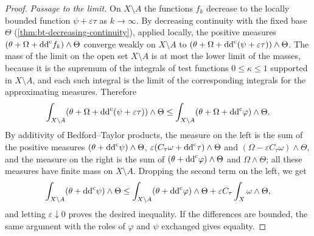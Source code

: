 \begin{proof}
\emph{Passage to the limit.} On $X\setminus A$ the functions $f_k$ decrease to the locally bounded function $\psi+\varepsilon\tau$ as $k\to\infty$. By decreasing continuity with the fixed base $\Theta$ (\cref{thm:bt-decreasing-continuity}), applied locally, the positive measures $(\theta+\Omega+\mathrm{dd}^{\mathrm{c}} f_k)\wedge\Theta$ converge weakly on $X\setminus A$ to $(\theta+\Omega+\mathrm{dd}^{\mathrm{c}}(\psi+\varepsilon\tau))\wedge\Theta$. The mass of the limit on the open set $X\setminus A$ is at most the lower limit of the masses, because it is the supremum of the integrals of test functions $0\leq\kappa\leq1$ supported in $X\setminus A$, and each such integral is the limit of the corresponding integrals for the approximating measures. Therefore
\[
 \int_{X\setminus A}(\theta+\Omega+\mathrm{dd}^{\mathrm{c}}(\psi+\varepsilon\tau))\wedge\Theta
 \leq\int_{X\setminus A}(\theta+\Omega+\mathrm{dd}^{\mathrm{c}}\varphi)\wedge\Theta.
\]
By additivity of Bedford--Taylor products, the measure on the left is the sum of the positive measures $(\theta+\mathrm{dd}^{\mathrm{c}}\psi)\wedge\Theta$, $\varepsilon(C_\tau\omega+\mathrm{dd}^{\mathrm{c}}\tau)\wedge\Theta$ and $(\Omega-\varepsilon C_\tau\omega)\wedge\Theta$, and the measure on the right is the sum of $(\theta+\mathrm{dd}^{\mathrm{c}}\varphi)\wedge\Theta$ and $\Omega\wedge\Theta$; all these measures have finite mass on $X\setminus A$. Dropping the second term on the left, we get
\[
 \int_{X\setminus A}(\theta+\mathrm{dd}^{\mathrm{c}}\psi)\wedge\Theta\leq\int_{X\setminus A}(\theta+\mathrm{dd}^{\mathrm{c}}\varphi)\wedge\Theta+\varepsilon C_\tau\int_X\omega\wedge\Theta,
\]
and letting $\varepsilon\downarrow0$ proves the desired inequality. If the differences are bounded, the same argument with the roles of $\varphi$ and $\psi$ exchanged gives equality.
\end{proof}

